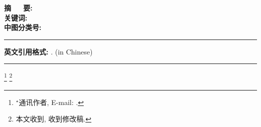\documentclass[Chinese]{APSart}
\begin{document}


%



\begin{center}
\begin{minipage}[c]{14cm}
	\textbf{摘~~~要:}\quad{\fangsong\cnabstract}\\
	\textbf{关键词:}\quad{\fangsong\cnkeywords}\\
	\textbf{中图分类号:}\quad\cnclassno\\
	\rule[3mm]{14cm}{0.2pt}\vskip-4mm
	\textbf{英文引用格式:} 
	\quad {}.
	 (in Chinese)\\ %
		\rule[3mm]{14cm}{0.2pt}
\end{minipage}
\end{center}
\footnote[0]{\hskip-1.5mm$^\star$通讯作者, E-mail: \caemail.}
\footnote[0]{本文\receivedate{}收到, \modifydate{}收到修改稿.}\vspace{-1em}


\pagewiselinenumbers   %
\end{document}

